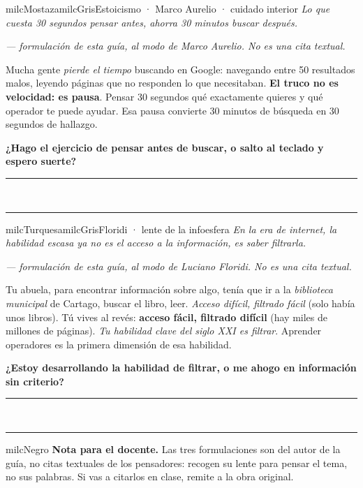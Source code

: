 \documentclass[11pt,letterpaper]{article}
\newcommand{\linead}[1]{\noindent\color{milcLinea}\rule{#1}{0.5pt}\color{milcNegro}}
\begin{document}
\begin{softbox}{milcMostaza}{milcGris}{Estoicismo · Marco Aurelio · cuidado interior}
\textit{Lo que cuesta 30 segundos pensar antes, ahorra 30 minutos buscar después.}

{\footnotesize\itshape\color{milcNegro!70}--- formulación de esta guía, al modo de Marco Aurelio. No es una cita textual.}

Mucha gente \emph{pierde el tiempo} buscando en Google: navegando entre 50 resultados malos, leyendo páginas que no responden lo que necesitaban. \textbf{El truco no es velocidad: es pausa}. Pensar 30 segundos qué exactamente quieres y qué operador te puede ayudar. Esa pausa convierte 30 minutos de búsqueda en 30 segundos de hallazgo.

\textbf{¿Hago el ejercicio de pensar antes de buscar, o salto al teclado y espero suerte?}
\end{softbox}
\linead{\linewidth}\\[1mm]
\linead{\linewidth}

\begin{softbox}{milcTurquesa}{milcGris}{Floridi · lente de la infoesfera}
\textit{En la era de internet, la habilidad escasa ya no es el acceso a la información, es saber filtrarla.}

{\footnotesize\itshape\color{milcNegro!70}--- formulación de esta guía, al modo de Luciano Floridi. No es una cita textual.}

Tu abuela, para encontrar información sobre algo, tenía que ir a la \emph{biblioteca municipal} de Cartago, buscar el libro, leer. \emph{Acceso difícil, filtrado fácil} (solo había unos libros). Tú vives al revés: \textbf{acceso fácil, filtrado difícil} (hay miles de millones de páginas). \emph{Tu habilidad clave del siglo XXI es filtrar}. Aprender operadores es la primera dimensión de esa habilidad.

\textbf{¿Estoy desarrollando la habilidad de filtrar, o me ahogo en información sin criterio?}
\end{softbox}
\linead{\linewidth}\\[1mm]
\linead{\linewidth}

\begin{infoband}{milcNegro}
\textbf{Nota para el docente.} Las tres formulaciones son del autor de la guía, no citas textuales de los pensadores: recogen su lente para pensar el tema, no sus palabras. Si vas a citarlos en clase, remite a la obra original.
\end{infoband}
\end{document}
